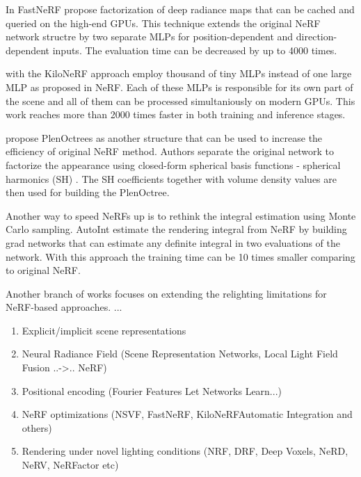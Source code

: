 In FastNeRF \cite{garbin2021fastnerf} propose factorization of deep radiance maps
that can be cached and queried on the high-end GPUs.
This technique extends the original NeRF network structre
by two separate MLPs for position-dependent and direction-dependent inputs.
The evaluation time can be decreased by up to 4000 times.

\cite{reiser2021kilonerf} with the KiloNeRF approach employ thousand of tiny MLPs 
instead of one large MLP as proposed in NeRF.
Each of these MLPs is responsible for its own part of the scene
and all of them can be processed simultaniously on modern GPUs.
This work reaches more than 2000 times faster in both training and inference stages.

\cite{yu2021plenoctrees} propose PlenOctrees as another structure that can be used to increase the efficiency of original NeRF method.
Authors separate the original network to factorize the appearance using closed-form
spherical basis functions - spherical harmonics (SH) \cite{mohlenkamp1997spherical}.
The SH coefficients together with volume density values are then used
for building the PlenOctree.

Another way to speed NeRFs up is to rethink the integral estimation using Monte Carlo sampling.
AutoInt \cite{lindell2021autoint} estimate the rendering integral from NeRF
by building grad networks that can estimate any definite integral in two evaluations of the network.
With this approach the training time can be 10 times smaller comparing to original NeRF.

Another branch of works focuses on extending the relighting limitations for NeRF-based approaches.
...



{\color{teal}
\begin{enumerate}
    \item Explicit/implicit scene representations
    \item Neural Radiance Field (Scene Representation Networks, Local Light Field Fusion ..->.. NeRF)
    \item Positional encoding (Fourier Features Let Networks Learn...) %
    \item NeRF optimizations (NSVF, FastNeRF, KiloNeRFAutomatic Integration and others)
    \item Rendering under novel lighting conditions (NRF, DRF, Deep Voxels, NeRD, NeRV, NeRFactor etc)
\end{enumerate}
}


